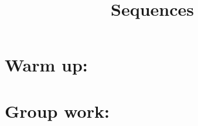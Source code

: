 \documentclass[]{ximera}
\title{Sequences}
\begin{document}
\begin{abstract}		\end{abstract}
\maketitle



\section{Warm up:}

	\begin{freeResponse}
	
	\end{freeResponse}
	
\begin{instructorNotes}

\end{instructorNotes}







\section{Group work:}



\begin{problem}

	\begin{freeResponse}
	
	\end{freeResponse}
	
\end{problem}

\begin{instructorNotes}

\end{instructorNotes}







\begin{problem}

	\begin{freeResponse}
	
	\end{freeResponse}
		
\end{problem}

\begin{instructorNotes}

\end{instructorNotes}
\end{document}
